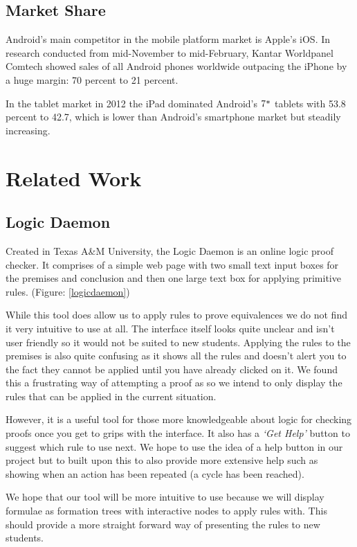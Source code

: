 \documentclass{report}
\begin{document}
\subsection{Market Share}

Android's main competitor in the mobile platform market is Apple's iOS. In research conducted from mid-November to mid-February, Kantar Worldpanel Comtech showed sales of all Android phones worldwide outpacing the iPhone by a huge margin: 70 percent to 21 percent\cite{androidstats}.

In the tablet market in 2012 the iPad dominated Android's $7\verb+"+$ tablets with 53.8 percent to 42.7, which is lower than Android's smartphone market but steadily increasing.

\section{Related Work}

\subsection{Logic Daemon}

Created in Texas A\&M University, the Logic Daemon\cite{logicdaemon} is an online logic proof checker. It comprises of a simple web page with two small text input boxes for the premises and conclusion and then one large text box for applying primitive rules. (Figure: \ref{logicdaemon})

While this tool does allow us to apply rules to prove equivalences we do not find it very intuitive to use at all. The interface itself looks quite unclear and isn't user friendly so it would not be suited to new students. Applying the rules to the premises is also quite confusing as it shows all the rules and doesn't alert you to the fact they cannot be applied until you have already clicked on it. We found this a frustrating way of attempting a proof as so we intend to only display the rules that can be applied in the current situation.

However, it is a useful tool for those more knowledgeable about logic for checking proofs once you get to grips with the interface. It also has a \textit{`Get Help'} button to suggest which rule to use next. We hope to use the idea of a help button in our project but to built upon this to also provide more extensive help such as showing when an action has been repeated (a cycle has been reached).

We hope that our tool will be more intuitive to use because we will display formulae as formation trees with interactive nodes to apply rules with. This should provide a more straight forward way of presenting the rules to new students.
\end{document}
